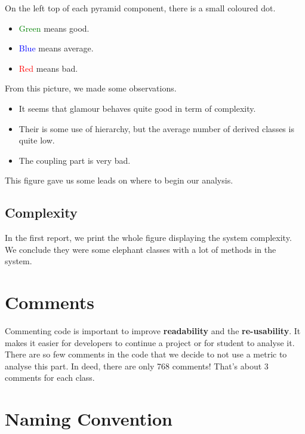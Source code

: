 \documentclass[11pt,a4paper]{article}
\begin{document}
On the left top of each pyramid component, there is a small coloured dot.
\begin{itemize}
\item \textcolor{green}{Green} means good.
\item \textcolor{blue}{Blue} means average.
\item \textcolor{red}{Red} means bad.
\end{itemize}

From this picture, we made some observations. 
\begin{itemize}
\item It seems that glamour behaves quite good in term of complexity.
\item Their is some use of hierarchy, but the average number of derived classes is quite low.
\item The coupling part is very bad. 
\end{itemize}

This figure gave us some leads on where to begin our analysis.  
\subsection{Complexity}
In the first report, we print the whole figure displaying the system complexity. We conclude they were some elephant classes with a lot of methods in the system.  
\section{Comments}
Commenting code is important to improve \textbf{readability} and  the \textbf{re-usability}. It makes it easier for developers to continue a project or for student to analyse it.\\

There are so few comments in the code that we decide to not use a metric to analyse this part. In deed, there are only 768 comments! That's about 3 comments for each class.
\section{Naming Convention}
\end{document}
